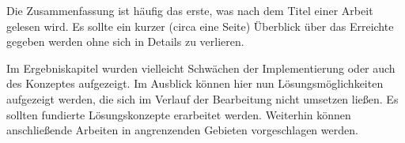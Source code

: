 
Die Zusammenfassung ist häufig das erste, was nach dem Titel einer Arbeit gelesen wird. Es sollte ein kurzer (circa eine Seite) Überblick über das Erreichte gegeben werden ohne sich in Details zu verlieren.

Im Ergebniskapitel wurden vielleicht Schwächen der Implementierung oder auch des Konzeptes aufgezeigt. Im Ausblick können hier nun Lösungsmöglichkeiten aufgezeigt werden, die sich im Verlauf der Bearbeitung nicht umsetzen ließen. Es sollten fundierte Lösungskonzepte erarbeitet werden. Weiterhin können anschließende Arbeiten in angrenzenden Gebieten vorgeschlagen werden.
